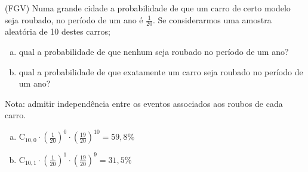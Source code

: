 \begin{ex}
(FGV) Numa grande cidade a probabilidade de que um carro de certo modelo seja roubado, no período de um ano é $\frac{1}{20}$. Se considerarmos uma amostra aleatória de 10 destes carros;
   \begin{enumerate}[(a)]
   \item qual a probabilidade de que nenhum seja roubado no período de um ano?
   \item  qual a probabilidade de que exatamente um carro seja roubado no período de um ano?
   \end{enumerate}
Nota: admitir independência entre os eventos associados aos roubos de cada carro.
 \begin{sol}
   \phantom{A}
     \begin{enumerate} [(a)]
         \item $\mathrm{C}_{{10},0}\cdot(\frac{1}{20})^0\cdot(\frac{19}{20})^{10}=59,8\%$
         \item $\mathrm{C}_{{10},1}\cdot(\frac{1}{20})^1\cdot(\frac{19}{20})^9=31,5\%$
     \end{enumerate}
 \end{sol}
\end{ex}